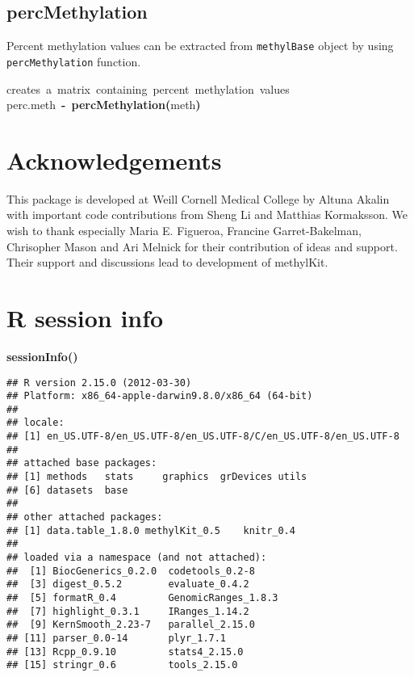 \documentclass{article}
\makeatletter
\newcommand{\hlfunctioncall}[1]{\textcolor[rgb]{.5,0,.33}{\textbf{#1}}}%
\newcommand{\hlkeyword}[1]{\textbf{#1}}%
\newcommand{\hlcomment}[1]{\textcolor[rgb]{.18,.6,.34}{#1}}%
\newcommand{\hlassignement}[1]{\textbf{#1}}%
\newcommand{\hlsymbol}[1]{#1}%
\newcommand{\hlstd}[1]{\textcolor[rgb]{0,0,0}{#1}}%
\newenvironment{kframe}{%
 \def\FrameCommand##1{\hskip\@totalleftmargin \hskip-\fboxsep
 \colorbox{shadecolor}{##1}\hskip-\fboxsep
     \hskip-\linewidth \hskip-\@totalleftmargin \hskip\columnwidth}%
 \MakeFramed {\advance\hsize-\width
   \@totalleftmargin\z@ \linewidth\hsize
   \@setminipage}}%
 {\par\unskip\endMakeFramed}
\newenvironment{knitrout}{}{} %
\makeatother
\begin{document}
\subsection{percMethylation}
Percent methylation values can be extracted from \texttt{methylBase} object by using \texttt{percMethylation} function.
\begin{knitrout}
\color{fgcolor}\begin{kframe}
\begin{flushleft}
\ttfamily\noindent
\hlcomment{\usebox{\hlnormalsizeboxhash}{\ }creates{\ }a{\ }matrix{\ }containing{\ }percent{\ }methylation{\ }values}\hspace*{\fill}\\
\hlstd{}\hlsymbol{perc.meth}{\ }\hlassignement{\usebox{\hlnormalsizeboxlessthan}-}{\ }\hlfunctioncall{percMethylation}\hlkeyword{(}\hlsymbol{meth}\hlkeyword{)}\mbox{}
\normalfont
\end{flushleft}
\end{kframe}
\end{knitrout}


\section{Acknowledgements}
This package is developed at Weill Cornell Medical College by Altuna Akalin with important code contributions from Sheng Li and Matthias Kormaksson. We wish to thank especially Maria E. Figueroa, Francine Garret-Bakelman, Chrisopher Mason and Ari Melnick for their contribution of ideas and support. Their support and discussions lead to development of methylKit.

\section{R session info}
\begin{knitrout}
\color{fgcolor}\begin{kframe}
\begin{flushleft}
\ttfamily\noindent
\hlfunctioncall{sessionInfo}\hlkeyword{(}\hlkeyword{)}\mbox{}
\normalfont
\end{flushleft}
\begin{verbatim}
## R version 2.15.0 (2012-03-30)
## Platform: x86_64-apple-darwin9.8.0/x86_64 (64-bit)
## 
## locale:
## [1] en_US.UTF-8/en_US.UTF-8/en_US.UTF-8/C/en_US.UTF-8/en_US.UTF-8
## 
## attached base packages:
## [1] methods   stats     graphics  grDevices utils    
## [6] datasets  base     
## 
## other attached packages:
## [1] data.table_1.8.0 methylKit_0.5    knitr_0.4       
## 
## loaded via a namespace (and not attached):
##  [1] BiocGenerics_0.2.0  codetools_0.2-8    
##  [3] digest_0.5.2        evaluate_0.4.2     
##  [5] formatR_0.4         GenomicRanges_1.8.3
##  [7] highlight_0.3.1     IRanges_1.14.2     
##  [9] KernSmooth_2.23-7   parallel_2.15.0    
## [11] parser_0.0-14       plyr_1.7.1         
## [13] Rcpp_0.9.10         stats4_2.15.0      
## [15] stringr_0.6         tools_2.15.0       
\end{verbatim}
\end{kframe}
\end{knitrout}



\end{document}
